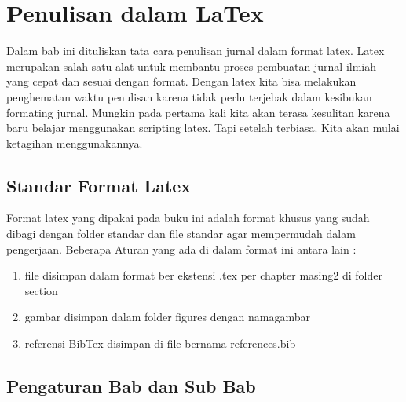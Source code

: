 \chapter{Penulisan dalam LaTex}

Dalam bab ini dituliskan tata cara penulisan jurnal dalam format latex. Latex merupakan salah satu alat untuk membantu proses pembuatan jurnal ilmiah yang cepat dan sesuai dengan format. Dengan latex kita bisa melakukan penghematan waktu penulisan karena tidak perlu terjebak dalam kesibukan formating jurnal. Mungkin pada pertama kali kita akan terasa kesulitan karena baru belajar menggunakan scripting latex. Tapi setelah terbiasa. Kita akan mulai ketagihan menggunakannya.


\section{Standar Format Latex}
Format latex yang dipakai pada buku ini adalah format khusus yang sudah dibagi dengan folder standar dan file standar agar mempermudah dalam pengerjaan. Beberapa Aturan yang ada di dalam format ini antara lain :
\begin{enumerate}

    \item file disimpan dalam format ber ekstensi .tex per chapter masing2 di folder section

    \item gambar disimpan dalam folder figures dengan namagambar

	\item referensi BibTex disimpan di file bernama references.bib
	
\end{enumerate}

\section{Pengaturan Bab dan Sub Bab}


